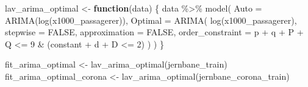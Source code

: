 \documentclass[
  danish,
]{article}
\newenvironment{Shaded}{\begin{snugshade}}{\end{snugshade}}
\newcommand{\AttributeTok}[1]{\textcolor[rgb]{0.40,0.45,0.13}{#1}}
\newcommand{\ConstantTok}[1]{\textcolor[rgb]{0.56,0.35,0.01}{#1}}
\newcommand{\ControlFlowTok}[1]{\textcolor[rgb]{0.00,0.23,0.31}{\textbf{#1}}}
\newcommand{\DecValTok}[1]{\textcolor[rgb]{0.68,0.00,0.00}{#1}}
\newcommand{\FunctionTok}[1]{\textcolor[rgb]{0.28,0.35,0.67}{#1}}
\newcommand{\NormalTok}[1]{\textcolor[rgb]{0.00,0.23,0.31}{#1}}
\newcommand{\OtherTok}[1]{\textcolor[rgb]{0.00,0.23,0.31}{#1}}
\newcommand{\SpecialCharTok}[1]{\textcolor[rgb]{0.37,0.37,0.37}{#1}}
\begin{document}
\begin{Shaded}
\begin{Highlighting}[]
\NormalTok{lav\_arima\_optimal }\OtherTok{\textless{}{-}} \ControlFlowTok{function}\NormalTok{(data) \{}
\NormalTok{  data }\SpecialCharTok{\%\textgreater{}\%}
    \FunctionTok{model}\NormalTok{(}
      \AttributeTok{Auto    =} \FunctionTok{ARIMA}\NormalTok{(}\FunctionTok{log}\NormalTok{(x1000\_passagerer)),}
      \AttributeTok{Optimal =} \FunctionTok{ARIMA}\NormalTok{(}
        \FunctionTok{log}\NormalTok{(x1000\_passagerer),}
        \AttributeTok{stepwise         =} \ConstantTok{FALSE}\NormalTok{,}
        \AttributeTok{approximation    =} \ConstantTok{FALSE}\NormalTok{,}
        \AttributeTok{order\_constraint =}\NormalTok{ p }\SpecialCharTok{+}\NormalTok{ q }\SpecialCharTok{+}\NormalTok{ P }\SpecialCharTok{+}\NormalTok{ Q }\SpecialCharTok{\textless{}=} \DecValTok{9} \SpecialCharTok{\&}\NormalTok{ (constant }\SpecialCharTok{+}\NormalTok{ d }\SpecialCharTok{+}\NormalTok{ D }\SpecialCharTok{\textless{}=} \DecValTok{2}\NormalTok{)}
\NormalTok{      )}
\NormalTok{    )}
\NormalTok{\}}

\NormalTok{fit\_arima\_optimal        }\OtherTok{\textless{}{-}} \FunctionTok{lav\_arima\_optimal}\NormalTok{(jernbane\_train)}
\NormalTok{fit\_arima\_optimal\_corona }\OtherTok{\textless{}{-}} \FunctionTok{lav\_arima\_optimal}\NormalTok{(jernbane\_corona\_train)}
\end{Highlighting}
\end{Shaded}
\end{document}
